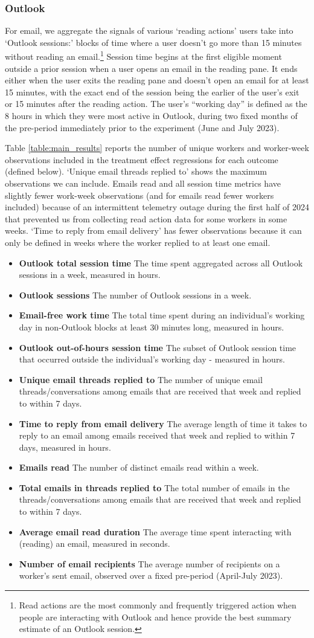 \documentclass{article}
\newcommand{\bitem}[1]{\item \textbf{#1}}
\begin{document}
\subsubsection{Outlook}
For email, we aggregate the signals of various `reading actions' users take into `Outlook sessions:' blocks of time where a user doesn't go more than 15 minutes without reading an email.\footnote{Read actions are the most commonly and frequently triggered action when people are interacting with Outlook and hence provide the best summary estimate of an Outlook session.} Session time begins at the first eligible moment outside a prior session when a user opens an email in the reading pane. It ends either when the user exits the reading pane and doesn't open an email for at least 15 minutes, with the exact end of the session being the earlier of the user's exit or 15 minutes after the reading action. The user's ``working day'' is defined as the 8 hours in which they were most active in Outlook, during two fixed months of the pre-period immediately prior to the experiment (June and July 2023).

Table \ref{table:main_results} reports the number of unique workers and worker-week observations included in the treatment effect regressions for each outcome (defined below). `Unique email threads replied to' shows the maximum observations we can include. Emails read and all session time metrics have slightly fewer work-week observations (and for emails read fewer workers included) because of an intermittent telemetry outage during the first half of 2024 that prevented us from collecting read action data for some workers in some weeks. `Time to reply from email delivery' has fewer observations because it can only be defined in weeks where the worker replied to at least one email.
\begin{itemize}[noitemsep]
    \bitem{Outlook total session time} The time spent aggregated across all Outlook sessions in a week, measured in hours.
    \bitem{Outlook sessions} The number of Outlook sessions in a week.
    \bitem{Email-free work time} The total time spent during an individual's working day in non-Outlook blocks at least 30 minutes long, measured in hours.
    \bitem{Outlook out-of-hours session time} The subset of Outlook session time that occurred outside the individual's working day - measured in hours.
    \bitem{Unique email threads replied to} The number of unique email threads/conversations among emails that are received that week and replied to within 7 days.
    \bitem{Time to reply from email delivery} The average length of time it takes to reply to an email among emails received that week and replied to within 7 days, measured in hours. 
    \bitem{Emails read} The number of distinct emails read within a week.
    \bitem{Total emails in threads replied to} The total number of emails in the threads/conversations among emails that are received that week and replied to within 7 days.
    \bitem{Average email read duration} The average time spent interacting with (reading) an email, measured in seconds.
    \bitem{Number of email recipients} The average number of recipients on a worker's sent email, observed over a fixed pre-period (April-July 2023).
\end{itemize}
\end{document}
